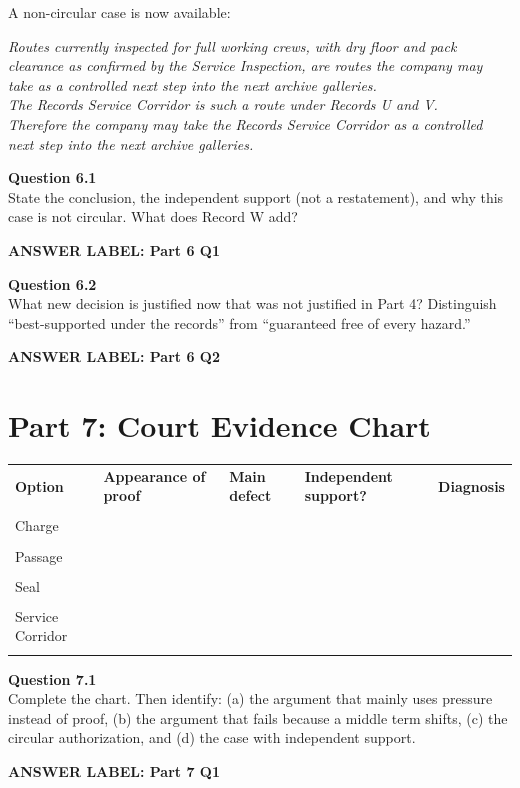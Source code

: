 \documentclass[12pt]{article}
\newcommand{\answerbox}[2]{\par\vspace{0.08em}\noindent\textbf{#1}\par\vspace{0.03em}\noindent\fbox{\begin{minipage}[t][#2]{\dimexpr\textwidth-2\fboxsep-2\fboxrule}\rule{\textwidth}{0pt}\vspace{#2}\end{minipage}}\par\vspace{0.16em}}
\newcommand{\cluebox}[1]{\par\vspace{0.12em}\noindent\begin{minipage}{\textwidth}\itshape #1\end{minipage}\par\vspace{0.12em}}
\begin{document}
A non-circular case is now available:

\cluebox{Routes currently inspected for full working crews, with dry floor and pack clearance as confirmed by the Service Inspection, are routes the company may take as a controlled next step into the next archive galleries.\\
The Records Service Corridor is such a route under Records U and V.\\
Therefore the company may take the Records Service Corridor as a controlled next step into the next archive galleries.}

\textbf{Question 6.1}\\[-0.15em]
State the conclusion, the independent support (not a restatement), and why this case is not circular. What does Record W add?
\answerbox{ANSWER LABEL: Part 6 Q1}{1.85in}

\textbf{Question 6.2}\\[-0.15em]
What new decision is justified now that was not justified in Part 4? Distinguish ``best-supported under the records'' from ``guaranteed free of every hazard.''
\answerbox{ANSWER LABEL: Part 6 Q2}{1.35in}

\newpage
\section*{Part 7: Court Evidence Chart}
\renewcommand{\arraystretch}{1.22}
\begin{tabular}{|p{}|p{}|p{}|p{}|p{}|}
\hline
\textbf{Option} & \textbf{Appearance of proof} & \textbf{Main defect} & \textbf{Independent support?} & \textbf{Diagnosis}\\\\ \hline
Charge & & & & \\\\[0.34in] \hline
Passage & & & & \\\\[0.34in] \hline
Seal & & & & \\\\[0.34in] \hline
Service Corridor & & & & \\\\[0.34in] \hline
\end{tabular}

\textbf{Question 7.1}\\[-0.15em]
Complete the chart. Then identify: (a) the argument that mainly uses pressure instead of proof, (b) the argument that fails because a middle term shifts, (c) the circular authorization, and (d) the case with independent support.
\answerbox{ANSWER LABEL: Part 7 Q1}{1.2in}
\end{document}
